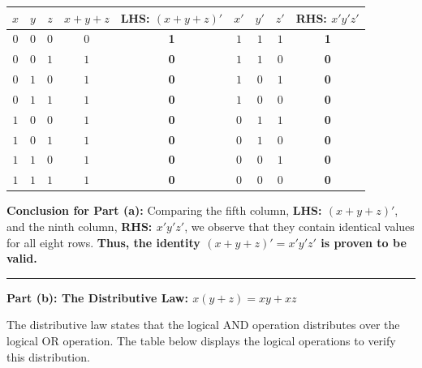 \documentclass[12pt,a3paper]{article}
\begin{document}
\begin{enumerate}
\begin{tcolorbox}[enhanced,breakable,ansbox,colback=cA!4,colframe=cA,boxrule=0.8pt,arc=5pt,title={\textbf{Answer}},fonttitle=\bfseries\color{white},colbacktitle=cA]
\begin{center}
\renewcommand{\arraystretch}{1.3}
\begin{tabular}{|c|c|c||c|c||c|c|c||c|}
\hline
\textbf{$x$} & \textbf{$y$} & \textbf{$z$} & \textbf{$x + y + z$} & \textbf{LHS: $(x + y + z)'$} & \textbf{$x'$} & \textbf{$y'$} & \textbf{$z'$} & \textbf{RHS: $x'y'z'$} \\
\hline
$0$ & $0$ & $0$ & $0$ & \textbf{1} & $1$ & $1$ & $1$ & \textbf{1} \\
\hline
$0$ & $0$ & $1$ & $1$ & \textbf{0} & $1$ & $1$ & $0$ & \textbf{0} \\
\hline
$0$ & $1$ & $0$ & $1$ & \textbf{0} & $1$ & $0$ & $1$ & \textbf{0} \\
\hline
$0$ & $1$ & $1$ & $1$ & \textbf{0} & $1$ & $0$ & $0$ & \textbf{0} \\
\hline
$1$ & $0$ & $0$ & $1$ & \textbf{0} & $0$ & $1$ & $1$ & \textbf{0} \\
\hline
$1$ & $0$ & $1$ & $1$ & \textbf{0} & $0$ & $1$ & $0$ & \textbf{0} \\
\hline
$1$ & $1$ & $0$ & $1$ & \textbf{0} & $0$ & $0$ & $1$ & \textbf{0} \\
\hline
$1$ & $1$ & $1$ & $1$ & \textbf{0} & $0$ & $0$ & $0$ & \textbf{0} \\
\hline
\end{tabular}
\end{center}

\vspace{0.2cm}
\textbf{Conclusion for Part (a):} 
Comparing the fifth column, \textbf{LHS: $(x + y + z)'$}, and the ninth column, \textbf{RHS: $x'y'z'$}, we observe that they contain identical values for all eight rows. \textbf{Thus, the identity $(x + y + z)' = x'y'z'$ is proven to be valid.}

\vspace{0.6cm}
\rule{\textwidth}{0.4pt}
\vspace{0.4cm}

\textbf{Part (b): The Distributive Law: $x(y + z) = xy + xz$}

The distributive law states that the logical AND operation distributes over the logical OR operation. The table below displays the logical operations to verify this distribution.


\end{tcolorbox}
\end{enumerate}
\end{document}
